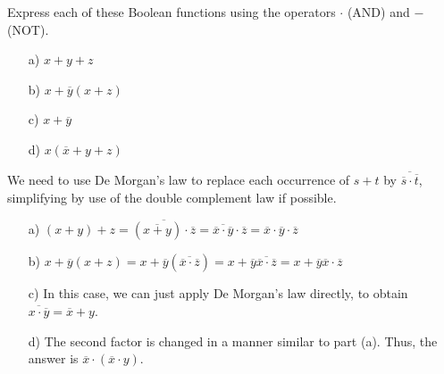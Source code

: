	\begin{exercise}
		Express each of these Boolean functions using the operators $\cdot$ (AND) and $-$ (NOT).
		
		\begin{enumerate}
			\item[a)] $x + y + z$
			\item[b)] $x + \overline{y}(x + z)$
			\item[c)] $x + \overline{y}$
			\item[d)] $x(\overline{x} + y + z)$
		\end{enumerate}
		
	\end{exercise}
	\begin{solution}
		We need to use De Morgan's law to replace each occurrence of $s + t$ by $\overline{\overline{s} \cdot \overline{t}}$, simplifying by use of the double complement law if possible.
		
		\begin{enumerate}
			\item[a)] $(x + y) + z = \overline{(\overline{x + y}) \cdot \overline{z}} = \overline{\overline{x} \cdot \overline{y}} \cdot \overline{z} = \overline{x} \cdot \overline{y} \cdot \overline{z}$
			\item[b)] $x + \overline{y}(x + z) = x + \overline{y}(\overline{\overline{x} \cdot \overline{z}}) = x + \overline{y}\overline{\overline{x} \cdot \overline{z}} = x + \overline{y}\overline{x} \cdot \overline{z}$
			\item[c)] In this case, we can just apply De Morgan's law directly, to obtain $\overline{x \cdot \overline{y}} = \overline{x} + y$.
			\item[d)] The second factor is changed in a manner similar to part (a). Thus, the answer is $\overline{x} \cdot (\overline{x} \cdot y)$.
		\end{enumerate}
		
	\end{solution}

